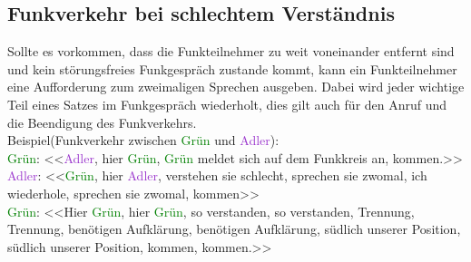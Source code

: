 \subsection{Funkverkehr bei schlechtem Verständnis}
Sollte es vorkommen, dass die Funkteilnehmer zu weit voneinander entfernt sind und kein störungsfreies Funkgespräch zustande kommt, kann ein Funkteilnehmer eine Aufforderung zum zweimaligen Sprechen ausgeben. Dabei wird jeder wichtige Teil eines Satzes im Funkgespräch wiederholt, dies gilt auch für den Anruf und die Beendigung des Funkverkehrs. \\
Beispiel(Funkverkehr zwischen \textcolor{green}{Grün} und \textcolor{DarkOrchid}{Adler}): \\
\textcolor{green}{Grün}: <<\textcolor{DarkOrchid}{Adler}, hier \textcolor{green}{Grün}, \textcolor{green}{Grün} meldet sich auf dem Funkkreis an, kommen.>> \\
\textcolor{DarkOrchid}{Adler}: <<\textcolor{green}{Grün}, hier \textcolor{DarkOrchid}{Adler}, verstehen sie schlecht, sprechen sie zwomal, ich wiederhole, sprechen sie zwomal, kommen>> \\
\textcolor{green}{Grün}: <<Hier \textcolor{green}{Grün}, hier \textcolor{green}{Grün}, so verstanden, so verstanden, Trennung, Trennung, benötigen Aufklärung, benötigen Aufklärung, südlich unserer Position, südlich unserer Position, kommen, kommen.>> \\



